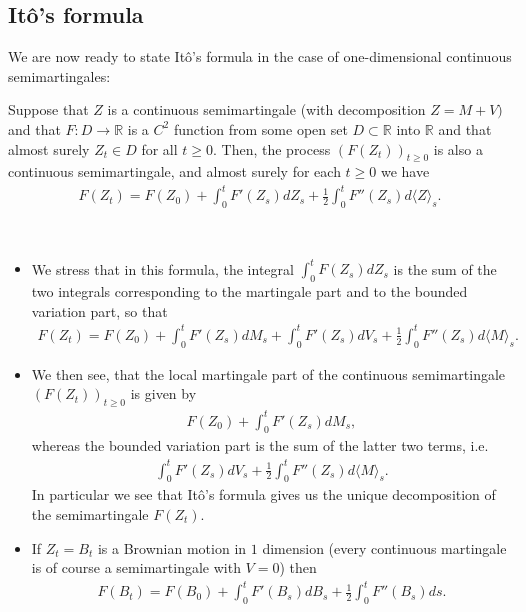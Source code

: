 \documentclass[../mainfile.tex]{subfiles}
\begin{document}
\subsection{Itô's formula}
We are now ready to state Itô's formula in the case of one-dimensional continuous semimartingales: 
\begin{thm} Suppose that $Z$ is a continuous semimartingale (with decomposition $Z=M+V)$ and that $F: D \to \mathbb{R}$ is a $C^2$ function from some open set $D \subset \mathbb{R}$ into $\mathbb{R}$ and that almost surely $Z_t \in D$ for all $t \geq 0$. Then, the process $(F(Z_t))_{t \geq 0}$ is also a continuous semimartingale, and almost surely for each $t \geq 0$ we have
\begin{align*}
F(Z_t)= F(Z_0)+ \int_0^t F' (Z_s)d Z_s + \frac{1}{2} \int_0^t F''(Z_s)d \langle Z \rangle_s.
\end{align*}
\end{thm}
\begin{rem} \
\begin{itemize}
\item We stress that in this formula,  the integral $\int_0^t F(Z_s)d Z_s$ is the sum of the two integrals corresponding to the martingale part and to the bounded variation part, so that 
\begin{align*}
F(Z_t)= F(Z_0) + \int_0^t F'(Z_s)d M_s  + \int_0^t F' (Z_s)dV_s + \frac{1}{2} \int_0^t F''(Z_s)d \langle M \rangle_s. 
\end{align*}
\item We then see, that the local martingale part of the continuous semimartingale $(F(Z_t))_{t \geq 0}$ is given by 
\begin{align*}
F(Z_0)+ \int_0^t F'(Z_s)dM_s,
\end{align*}
whereas the bounded variation part is the sum of the latter two terms, i.e.
\begin{align*}
\int_0^t F' (Z_s) dV_s + \frac{1}{2} \int_0^t F''(Z_s) d \langle M \rangle_s. 
\end{align*}
In particular we see that Itô's formula gives us the unique decomposition of the semimartingale $F(Z_t)$. 
\item If $Z_t=B_t$ is a Brownian motion in $1$ dimension (every continuous martingale is of course a semimartingale with $V=0$) then 
\begin{align*}
F(B_t)= F(B_0) + \int_0^t F'(B_s)dB_s + \frac{1}{2} \int_0^t F''(B_s)ds. 
\end{align*}
\end{itemize} 
\end{rem}
\end{document}
